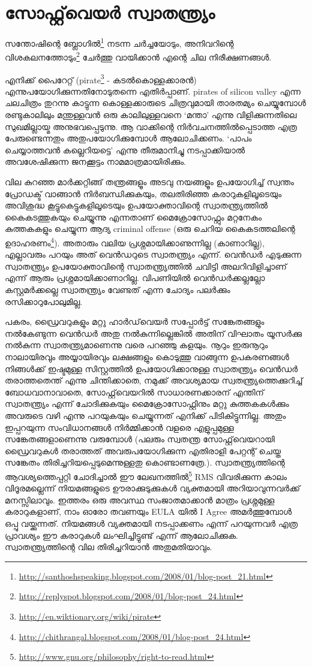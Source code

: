 \section*{സോഫ്റ്റ്‌വെയര്‍ സ്വാതന്ത്ര്യം}
\vskip 2pt

സന്തോഷിന്റെ ബ്ലോഗില്‍\footnote{\url{http://santhoshspeaking.blogspot.com/2008/01/blog-post_21.html}} നടന്ന ചര്‍ച്ചയോടും, അനിവറിന്റെ വിശകലനത്തോടും\footnote{\url{http://replyspot.blogspot.com/2008/01/blog-post_24.html}} ചേര്‍ത്തു വായിക്കാന്‍ എന്റെ ചില നിരീക്ഷണങ്ങള്‍.

എനിക്ക് പൈറേറ്റ് (pirate\footnote{\url{http://en.wiktionary.org/wiki/pirate}} - കടല്‍കൊള്ളക്കാരന്‍) എന്നുപയോഗിക്കുന്നതിനോടുതന്നെ എതിര്‍പ്പാണ്. pirates of silicon valley എന്ന ചലചിത്രം തുറന്നു കാട്ടുന്ന കൊള്ളക്കാരുടെ ചിത്രവുമായി താരതമ്യം ചെയ്യുമ്പോള്‍ രണ്ടുകാലിലും മന്തുള്ളവന്‍ ഒരു കാലിലുള്ളവനെ ‘മന്താ’ എന്നു വിളിക്കുന്നതിലെ സുഖമില്ലായ്മ അനുഭവപ്പെടുന്നു. ആ വാക്കിന്റെ നിര്‍വചനത്തില്‍‌പ്പെടാത്ത എത്ര പേരുണ്ടെന്നതും അതുപയോഗിക്കുമ്പോള്‍ ആലോചിക്കണം. ‘പാപം ചെയ്യാത്തവന്‍ കല്ലെറിയട്ടെ’ എന്നു തീരുമാനിച്ചു നടപ്പാക്കിയാല്‍ അവശേഷിക്കുന്ന ജനക്കൂട്ടം നാമമാത്രമായിരിക്കും.

വില കുറഞ്ഞ മാര്‍ക്കറ്റിങ്ങ് തന്ത്രങ്ങളൂം അടവു നയങ്ങളൂം ഉപയോഗിച്ച് സ്വന്തം പ്രോഡക്ട് വാങ്ങാന്‍ നിര്‍ബന്ധിക്കുകയും, തലതിരിഞ്ഞ കരാറുകളിലൂടെയും അവിശുദ്ധ കൂട്ടുകെട്ടുകളിലൂടെയും ഉപയോക്താവിന്റെ സ്വാതന്ത്ര്യത്തില്‍ കൈകടത്തുകയും ചെയ്യുന്നു എന്നതാണ് മൈക്രോസോഫ്റ്റും മറ്റനേകം കുത്തകകളും ചെയ്യുന്ന ആദ്യ criminal offense (ഒരു ചെറിയ കൈകടത്തലിന്റെ ഉദാഹരണം\footnote{\url{http://chithrangal.blogspot.com/2008/01/blog-post_24.html}}). അതാരും വലിയ പ്രശ്നമായിക്കാണുന്നില്ല (കാണാറില്ല), എല്ലാവരും പറയും അത് വെന്‍ഡറുടെ സ്വാതന്ത്ര്യം എന്ന്. വെന്‍ഡര്‍ എടുക്കുന്ന സ്വാതന്ത്ര്യം ഉപയോക്താവിന്റെ സ്വാതന്ത്ര്യത്തില്‍ ചവിട്ടി അലറിവിളിച്ചാണ് എന്ന് ആരും പ്രശ്നമായിക്കാണാറില്ല. വിപണിയില്‍ വെന്‍ഡര്‍ക്കല്ലല്ലോ കസ്റ്റമര്‍ക്കല്ലെ സ്വാതന്ത്ര്യം വേണ്ടത് എന്ന ചോദ്യം പലര്‍ക്കും രസിക്കാറുപോലുമില്ല.

പകരം, ഡ്രൈവറുകളും മറ്റു ഹാര്‍ഡ്‌വെയര്‍ സപ്പോര്‍ട്ട് സങ്കേതങ്ങളും നല്‍കേണ്ടുന്ന വെന്‍ഡര്‍ അതു നല്‍കുന്നില്ലെങ്കില്‍ അതിന് വിഘാതം യൂസര്‍ക്കു നല്‍കുന്ന സ്വാതന്ത്ര്യമാണെന്നു വരെ പറഞ്ഞു കളയും. നൂറും ഇരുനൂറും നാലായിരവും അയ്യായിരവും ലക്ഷങ്ങളും കൊടുത്തു വാങ്ങുന്ന ഉപകരണങ്ങള്‍ നിങ്ങള്‍ക്ക് ഇഷ്ടമുള്ള സിസ്റ്റത്തില്‍ ഉപയോഗിക്കാനുള്ള സ്വാതന്ത്ര്യം വെന്‍ഡര്‍ തരാത്തതെന്ത് എന്നു ചിന്തിക്കാതെ, നമുക്ക് അവശ്യമായ സ്വതന്ത്ര്യത്തെക്കുറിച്ച് ബോധവാനാവാതെ, സോഫ്റ്റ്‌വെയറില്‍ സാധാരണക്കാരന് എന്തിന് സ്വാതന്ത്ര്യം എന്ന് ചോദിക്കുകയും മൈക്രോസോഫ്റ്റിനും മറ്റു കുത്തകകള്‍ക്കും അവരുടെ വഴി എന്നു പറയുകയും ചെയ്യുന്നത് എനിക്ക് പിടികിട്ടുന്നില്ല. അതും ഇപ്പറയുന്ന സംവിധാനങ്ങള്‍ നിര്‍മ്മിക്കാന്‍ വളരെ എളുപ്പമുള്ള സങ്കേതങ്ങളാണെന്നു വരുമ്പോള്‍ (പലരും സ്വതന്ത്ര സോഫ്റ്റ്‌വെയറായി ഡ്രൈവറുകള്‍ തരാത്തത് അവരുപയോഗിക്കുന്ന എതിരാളി പേറ്റന്റ് ചെയ്ത സങ്കേതം തിരിച്ചറിയപ്പെടുമെന്നുള്ളതു കൊണ്ടാണത്രേ.). സ്വാതന്ത്ര്യത്തിന്റെ ആവശ്യത്തെപ്പറ്റി ചോദിച്ചാല്‍ ഈ ലേഖനത്തില്‍\footnote{\url{http://www.gnu.org/philosophy/right-to-read.html}} RMS വിവരിക്കുന്ന കാലം വിദൂരമല്ലെന്ന് നിയമങ്ങളുടെ ഊരാക്കുടുക്കുകള്‍ വ്യക്തമായി അറിയാവുന്നവര്‍ക്ക് മനസ്സിലാവും. ഇത്തരം ഒരു അവസ്ഥ സംജാതമാക്കാന്‍ മാത്രം പ്രശ്നമുള്ള കരാറുകളാണ്, നാം ഓരോ തവണയും EULA യില്‍ I Agree അമര്‍ത്തുമ്പോള്‍ ഒപ്പു വയ്ക്കുന്നത്. നിയമങ്ങള്‍ വ്യക്തമായി നടപ്പാക്കണം എന്ന് പറയുന്നവര്‍ എത്ര പ്രാവശ്യം ഈ കരാറുകള്‍ ലംഘിച്ചിട്ടുണ്ട് എന്ന് ആലോചിക്കുക. സ്വാതന്ത്ര്യത്തിന്റെ വില തിരിച്ചറിയാന്‍ അതുമതിയാവും.

